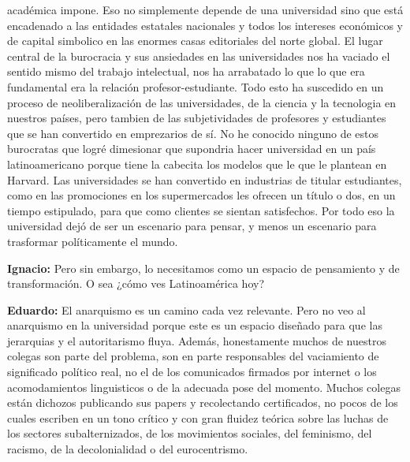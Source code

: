 \documentclass[
]{interact}
\begin{document}
académica impone. Eso no simplemente depende de una universidad sino que
está encadenado a las entidades estatales nacionales y todos los
intereses económicos y de capital simbolico en las enormes casas
editoriales del norte global. El lugar central de la burocracia y sus
ansiedades en las universidades nos ha vaciado el sentido mismo del
trabajo intelectual, nos ha arrabatado lo que lo que era fundamental era
la relación profesor-estudiante. Todo esto ha suscedido en un proceso de
neoliberalización de las universidades, de la ciencia y la tecnologia en
nuestros países, pero tambien de las subjetividades de profesores y
estudiantes que se han convertido en emprezarios de sí. No he conocido
ninguno de estos burocratas que logré dimesionar que supondria hacer
universidad en un país latinoamericano porque tiene la cabecita los
modelos que le que le plantean en Harvard. Las universidades se han
convertido en industrias de titular estudiantes, como en las promociones
en los supermercados les ofrecen un título o dos, en un tiempo
estipulado, para que como clientes se sientan satisfechos. Por todo eso
la universidad dejó de ser un escenario para pensar, y menos un
escenario para trasformar políticamente el mundo.

\textbf{Ignacio:} Pero sin embargo, lo necesitamos como un espacio de
pensamiento y de transformación. O sea ¿cómo ves Latinoamérica hoy?

\textbf{Eduardo:} El anarquismo es un camino cada vez relevante. Pero no
veo al anarquismo en la universidad porque este es un espacio diseñado
para que las jerarquias y el autoritarismo fluya. Además, honestamente
muchos de nuestros colegas son parte del problema, son en parte
responsables del vaciamiento de significado político real, no el de los
comunicados firmados por internet o los acomodamientos linguisticos o de
la adecuada pose del momento. Muchos colegas están dichozos publicando
sus papers y recolectando certificados, no pocos de los cuales escriben
en un tono crítico y con gran fluidez teórica sobre las luchas de los
sectores subalternizados, de los movimientos sociales, del feminismo,
del racismo, de la decolonialidad o del eurocentrismo.
\end{document}
